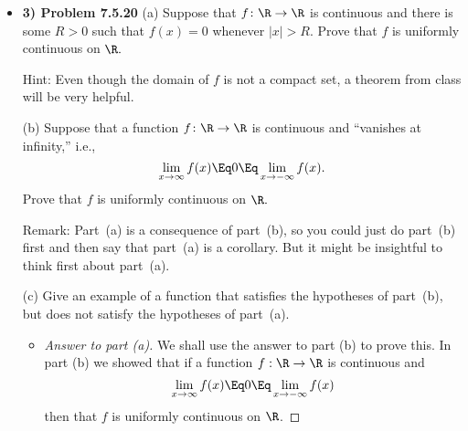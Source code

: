 \documentclass[10pt,twoside]{article}
\begin{document}
\begin{itemize}
\begin{proof}[Answer.]
    Thus, $f'$ is bounded in either case and therefore bounded over $[0,1)$. Therefore, we can choose \newline
    $C =\displaystyle\sup_{x\in [0,1)}{|f'(x)|}$. By the mean value theorem, there is a $c\in [0,1)$ such that \[f'(c) = \frac{f(y) - f(x)}{y -x}\]
    which implies after taking absolute values and multiplying by the denominator,
    \[|f(x) - f(y)| = f'(c)|x - y| \leq C|x-y|\]
    
    Therefore, $f$ is Lipschitz on $(-1,1)$.\smallskip
    
    Additionally, $f'$ is continuous on $[0,1)$.
    
    \iffalse
    Thus, $x^{-b}$ is a strictly decreasing function and as $x$ approaches $0$, then $\cos(x^{-b})$ approaches $1$ and $\sin(x^{-b})$ approaches $0$.
    
    Additionally, $x^{a-1}$ is also a strictly increasing function that satisfies that $x^{a-1} < 1$ for all $0<x<1$ and $a - 1 > 0$. As $x$ approaches $1$, $x^{a-1}$ approaches $1$ and as $x$ approaches $0$, $x^{a-1}$ approaches $0$.
    
    Lastly, $x^{a-b-1}$ for $a-b-1>0$ is a strictly increasing function 
    \fi
    \end{proof}
    
    \item\textbf{3)  Problem 7.5.20} \newline
    \noindent\makebox[\linewidth]{\rule{18cm}{0.4pt}}
    (a) Suppose that $f \colon \R \to \R$ is continuous
and there is some $R > 0$ such that $f(x) = 0$ whenever $|x| > R.$
Prove that $f$ is uniformly continuous on $\R.$

Hint: Even though the domain of $f$ is not a compact set,
a theorem from class will be very helpful.

\medskip
(b) Suppose that a function $f \colon \R \to \R$ is continuous
and ``vanishes at infinity,'' i.e.,
$$\lim_{x \to \infty} f(x)
\Eq 0
\Eq \lim_{x \to -\infty} f(x).$$
Prove that $f$ is uniformly continuous on $\R.$

Remark: Part~(a) is a consequence of part~(b), so you could just do
part~(b) first and then say that part~(a) is a corollary.
But it might be insightful to think first about part~(a).

\medskip
(c) Give an example of a function that satisfies the hypotheses
of part~(b), but does not satisfy the hypotheses of part~(a).


    \begin{itemize}
    \pagebreak
        \item\begin{proof}[Answer to part (a)]
        We shall use the answer to part (b) to prove this. In part (b) we showed that if a function $f:\R\to\R$ is continuous and \[\lim_{x \to \infty} f(x)
        \Eq 0
        \Eq \lim_{x \to -\infty} f(x)\]
        then that $f$ is uniformly continuous on $\R$.\smallskip
        

\end{proof}
\end{itemize}
\end{itemize}
\end{document}
